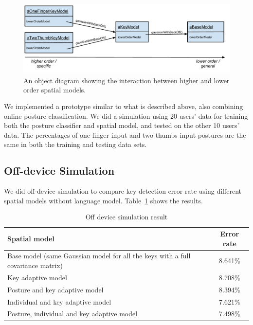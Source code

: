 \documentclass{sigchi}
\newcommand\tabhead[1]{\small\textbf{#1}}
\begin{document}
\begin{figure}[tb]
  \centering
  \includegraphics[width=1\columnwidth]{figures/chain-of-responsibility.pdf}
  \caption{An object diagram showing the interaction between higher and lower
  order spatial models.}
  \label{fig:chain-of-responsibility}
\end{figure}

We implemented a prototype similar to what is described above, also combining
online posture classification. We did a simulation using 20 users' data for training
both the posture classifier and spatial model, and tested on the other 10 users' 
data. The percentages of one finger input and two thumbs input postures are the same in both the training and testing data sets.

\subsection{Off-device Simulation}
We did off-device simulation to compare
key detection error rate using different spatial models without language model.
Table~\ref{tab:off-device} shows the results.

\begin{table}[tb]
  \centering
  \begin{tabularx}{\columnwidth}{|X|c|}
  \hline
  \tabhead{Spatial model} & \tabhead{Error rate} \\
  \hline
  \multicolumn{1}{|p{0.7\columnwidth}|}{Base model (same Gaussian model for
    all the keys with a full covariance matrix)} & 8.641\% \\
  \hline
  Key adaptive model & 8.708\% \\
  \hline
  Posture and key adaptive model & 8.394\% \\
  \hline
  Individual and key adaptive model  & 7.621\%
  \\
  \hline
  Posture, individual and key adaptive model &  7.498\%
  \\
  \hline
  \end{tabularx}
  \caption{Off device simulation result}
  \label{tab:off-device}
\end{table}
\end{document}

